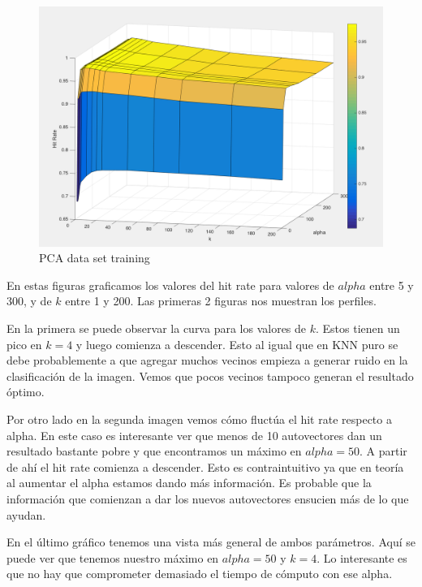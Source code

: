 \begin{figure}[h!]
  \begin{center}
	\includegraphics[scale=0.5]{exp2/PCA-HitRate-3.png}
	\caption{PCA data set training}
  \end{center}
\end{figure}

En estas figuras graficamos los valores del hit rate para valores de $alpha$ entre 5 y 300, y de $k$ entre 1 y 200. Las primeras 2 figuras nos muestran los perfiles. 

En la primera se puede observar la curva para los valores de $k$. Estos tienen un pico en $k = 4$ y luego comienza a descender. Esto al igual que en KNN puro se debe probablemente a que agregar muchos vecinos empieza a generar ruido en la clasificación de la imagen. Vemos que pocos vecinos tampoco generan el resultado óptimo.

Por otro lado en la segunda imagen vemos cómo fluctúa el hit rate respecto a alpha. En este caso es interesante ver que menos de 10 autovectores dan un resultado bastante pobre y que encontramos un máximo en $alpha = 50$. A partir de ahí el hit rate comienza a descender. Esto es contraintuitivo ya que en teoría al aumentar el alpha estamos dando más información. Es probable que la información que comienzan a dar los nuevos autovectores ensucien más de lo que ayudan.

En el último gráfico tenemos una vista más general de ambos parámetros. Aquí se puede ver que tenemos nuestro máximo en $alpha = 50$ y $k = 4$. Lo interesante es que no hay que comprometer demasiado el tiempo de cómputo con ese alpha.

